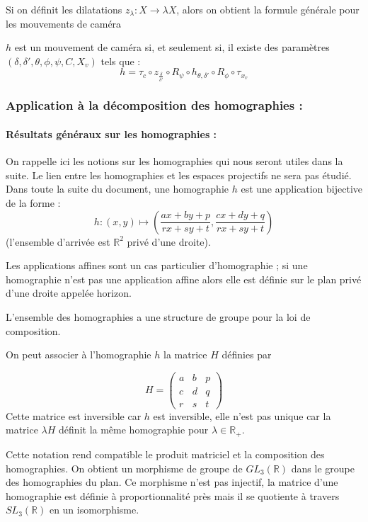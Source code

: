 Si on définit les dilatations $z_{\lambda}:X\rightarrow \lambda X$, alors on obtient la formule générale pour les mouvements de caméra
\begin{prop}
$h$ est un mouvement de caméra si, et seulement si, il existe des paramètres $(\delta,\delta',\theta,\phi,\psi,C,X_v)$ tels que :
\begin{equation}
h = \tau_{c} \circ z_{\frac{\delta}{\delta'}}  \circ R_{\psi} \circ h_{\theta,\delta'} \circ R_{\phi} \circ \tau_{x_{v}}
\label{formul_decomp}
\end{equation}
\end{prop}



\subsubsection{Application à la décomposition des homographies :}
\paragraph{Résultats généraux sur les homographies :}
 On rappelle ici les notions sur les homographies qui nous seront utiles dans la suite. Le lien entre les homographies et les espaces projectifs ne sera pas étudié. Dans toute la suite du document, une homographie $h$ est une application bijective de la forme :
	\[h:(x,y)\mapsto \left(\frac{ax+by+p}{rx+sy+t},\frac{cx+dy+q}{rx+sy+t}\right)\]
(l'ensemble d'arrivée est $\mathbb R^2$ privé d'une droite).

Les applications affines sont un cas particulier d'homographie ; si une homographie n'est pas une application affine alors elle est définie sur le plan privé d'une droite appelée horizon.

L'ensemble des homographies a une structure de groupe pour la loi de composition.

On peut  associer à l'homographie $h$ la matrice $H$ définies par
  
\begin{equation*}
	H=\begin{pmatrix}
	a&b&p\\c&d&q\\r&s&t
	\end{pmatrix}
\end{equation*}
Cette matrice est inversible car $h$ est inversible, elle n'est pas unique car la matrice $\lambda H$ définit la même homographie pour $\lambda \in \mathbb{R}_+$.

Cette notation rend compatible le produit matriciel et la composition des homographies. On obtient un morphisme de groupe de $GL_{3}(\mathbb{R})$ dans le groupe des homographies du plan. Ce morphisme n'est pas injectif, la matrice d'une homographie est définie à proportionnalité près mais il se quotiente à travers $SL_{3}(\mathbb{R})$ en un isomorphisme.

